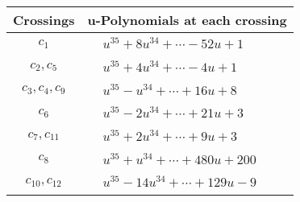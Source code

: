 \documentclass[1p]{elsarticle_modified}
\theoremstyle{definition}
\begin{document}
\begin{tabular}{m{50pt}|m{274pt}}
Crossings & \hspace{64pt}u-Polynomials at each crossing \\
\hline $$\begin{aligned}c_{1}\end{aligned}$$&$\begin{aligned}
&u^{35}+8 u^{34}+\cdots-52 u+1
\end{aligned}$\\
\hline $$\begin{aligned}c_{2},c_{5}\end{aligned}$$&$\begin{aligned}
&u^{35}+4 u^{34}+\cdots-4 u+1
\end{aligned}$\\
\hline $$\begin{aligned}c_{3},c_{4},c_{9}\end{aligned}$$&$\begin{aligned}
&u^{35}- u^{34}+\cdots+16 u+8
\end{aligned}$\\
\hline $$\begin{aligned}c_{6}\end{aligned}$$&$\begin{aligned}
&u^{35}-2 u^{34}+\cdots+21 u+3
\end{aligned}$\\
\hline $$\begin{aligned}c_{7},c_{11}\end{aligned}$$&$\begin{aligned}
&u^{35}+2 u^{34}+\cdots+9 u+3
\end{aligned}$\\
\hline $$\begin{aligned}c_{8}\end{aligned}$$&$\begin{aligned}
&u^{35}+u^{34}+\cdots+480 u+200
\end{aligned}$\\
\hline $$\begin{aligned}c_{10},c_{12}\end{aligned}$$&$\begin{aligned}
&u^{35}-14 u^{34}+\cdots+129 u-9
\end{aligned}$\\
\hline
\end{tabular}\\~\\
\newpage\renewcommand{\arraystretch}{1}
\end{document}
